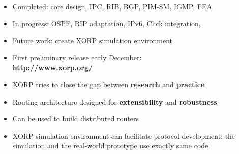 \documentclass[landscape]{icsislides}
\begin{document}
\begin{slide}

\begin{itemize}

  \item Completed: core design, IPC, RIB, BGP, PIM-SM, IGMP, FEA

  \item In progress: OSPF, RIP adaptation, IPv6, Click integration,

  \item Future work: create XORP simulation environment

  \item First preliminary release early December: \\
  {\bf http://www.xorp.org/}

\end{itemize}

\end{slide}

\begin{slide}

\begin{itemize}

  \item XORP tries to close the gap between {\bf research} and {\bf practice}

  \item Routing architecture designed for {\bf extensibility} and {\bf
  robustness}.

  \item Can be used to build distributed routers

  \item XORP simulation environment can facilitate protocol development: the
  simulation and the real-world prototype use exactly same code

\end{itemize}

\end{slide}

\end{document}
